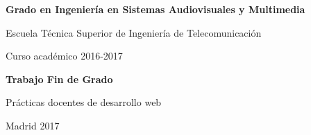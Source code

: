\documentclass[oneside,a4paper,11pt]{book}
\begin{document}
\vspace{5mm}
\begin{center}
{\Large {\bf Grado en Ingeniería en Sistemas Audiovisuales y Multimedia}}
\vspace{5mm}

{\large Escuela Técnica Superior de Ingeniería de Telecomunicación}
\vspace{5mm}

{\large Curso académico 2016-2017}

\vspace{1.0cm}

{\large {\bf Trabajo Fin de Grado}} 

\vspace{2cm}
{\Huge {Prácticas docentes de desarrollo web}}


\vspace{4cm}
\end{center}
\vspace{0.5cm}
\begin{center}
\large{Madrid 2017}
\end{center}



\clearpage
\thispagestyle{empty}

\vspace{5cm}


\end{document}
